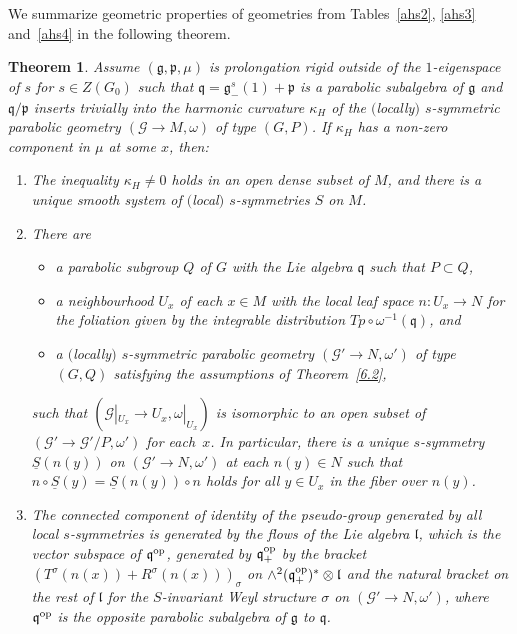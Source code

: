 \documentclass[pdftex]{sigma}
\newcommand{\om}{\omega}
\newcommand{\si}{\sigma}
\newcommand{\un}{\underline}
\newcommand{\ba}{\mathcal{G}}
\newcommand{\fg}{\mathfrak g}
\newcommand{\fv}{\mathfrak q}
\newcommand{\fp}{\mathfrak p}
\newcommand{\fl}{\mathfrak l}
\numberwithin{equation}{section}
\newtheorem{Theorem}{Theorem}[section]
\begin{document}
We summarize geometric properties of geometries from Tables~\ref{ahs2}, \ref{ahs3} and~\ref{ahs4} in the following theorem.

\begin{Theorem}\label{6.3}
Assume $(\fg,\fp,\mu)$ is prolongation rigid outside of the $1$-eigenspace of $s$ for $s\in Z(G_0)$ such that $\fv=\fg_-^s(1)+\fp$ is a parabolic subalgebra of $\fg$ and $\fv/\fp$ inserts trivially into the harmonic curvature $\kappa_H$ of the $($locally$)$ $s$-symmetric parabolic geometry $(\ba\to M,\om)$ of type $(G,P)$. If $\kappa_H$ has a non-zero component in $\mu$ at some $x$, then:
\begin{enumerate}\itemsep=0pt
\item[$1.$] The inequality $\kappa_H\neq 0$ holds in an open dense subset of $M$, and there is a unique smooth system of $($local$)$ $s$-symmetries $S$ on $M$.
\item[$2.$] There are
\begin{itemize}\itemsep=0pt
\item a parabolic subgroup $Q$ of $G$ with the Lie algebra $\fv$ such that $P\subset Q$,
\item a neighbourhood $U_x$ of each $x\in M$ with the local leaf space $n\colon U_x\to N$ for the foliation given by the integrable distribution $Tp\circ \om^{-1}(\fv)$, and
\item a $($locally$)$ $s$-symmetric parabolic geometry $(\ba'\to N,\om')$ of type~$(G,Q)$ satisfying the assumptions of Theorem~{\rm \ref{6.2}},
\end{itemize}
such that $(\ba|_{U_x}\to U_x,\om|_{U_x})$ is isomorphic to an open subset of $(\ba'\to \ba'/P,\om')$ for each~$x$. In particular, there is a unique $s$-symmetry $\un S(n(y))$ on $(\ba'\to N,\om')$ at each $n(y)\in N$ such that $n\circ \un S(y)=\un S(n(y))\circ n$ holds for all $y\in U_x$ in the fiber over $n(y)$.
\item[$3.$] The connected component of identity of the pseudo-group generated by all local $s$-sym\-met\-ries is generated by the flows of the Lie algebra $\fl$, which is the vector subspace of $\fv^{\rm op}$, generated by $\fv^{\rm op}_+$ by the bracket $(T^\si(n(x))+R^\si(n(x)))_\si$ on $\wedge^2 (\fv^{\rm op}_+)^*\otimes \fl$ and the natural bracket on the rest of $\fl$ for the $S$-invariant Weyl structure $\si$ on $(\ba'\to N,\om')$, where $\fv^{\rm op}$ is the opposite parabolic subalgebra of $\fg$ to $\fv$.


\end{enumerate}
\end{Theorem}
\end{document}
